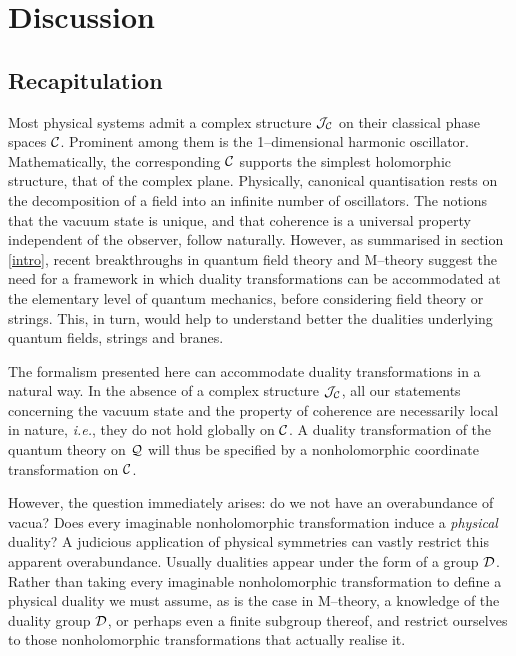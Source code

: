 \documentclass[a4paper,a4paper]{article}
\begin{document}
\section{Discussion}\label{discussion}

\subsection{Recapitulation}\label{recap}

Most physical systems admit a complex structure ${\cal J}_{\cal C}$ on their 
classical phase spaces ${\cal C}$. Prominent among them is the 
1--dimensional harmonic oscillator. Mathematically, the corresponding 
${\cal C}$ supports the simplest holomorphic structure, that of the complex plane.
Physically, canonical quantisation rests on the decomposition 
of a field into an infinite number of oscillators. The notions that the vacuum state 
is unique, and that coherence is a universal property independent of the 
observer, follow naturally. However, as summarised in section \ref{intro}, 
recent breakthroughs in quantum field theory and M--theory suggest the need 
for a framework in which duality transformations can be accommodated at the elementary 
level of quantum mechanics, before considering field theory or strings. 
This, in turn, would help to understand better the dualities underlying 
quantum fields, strings and branes.

The formalism presented here can accommodate duality transformations in a 
natural way. In the absence of a complex structure ${\cal J}_{\cal C}$, 
all our statements concerning the vacuum state and the property of coherence are 
necessarily local in nature, {\it i.e.}, they do not hold globally on ${\cal C}$. 
A duality transformation of the quantum theory on ${\cal Q}$ will thus be specified 
by a nonholomorphic coordinate transformation on ${\cal C}$.

However, the question immediately arises: do we not have an overabundance 
of vacua? Does every imaginable nonholomorphic transformation induce a 
{\it physical}\/ duality? A judicious application of physical symmetries 
can vastly restrict this apparent overabundance. Usually dualities appear under the form 
of a group ${\cal D}$. Rather than taking every imaginable nonholomorphic transformation 
to define a physical duality we must assume, as is the case in M--theory, 
a knowledge of the duality group ${\cal D}$, or perhaps even a finite subgroup thereof, 
and restrict ourselves to those nonholomorphic transformations that actually realise it. 
\end{document}
